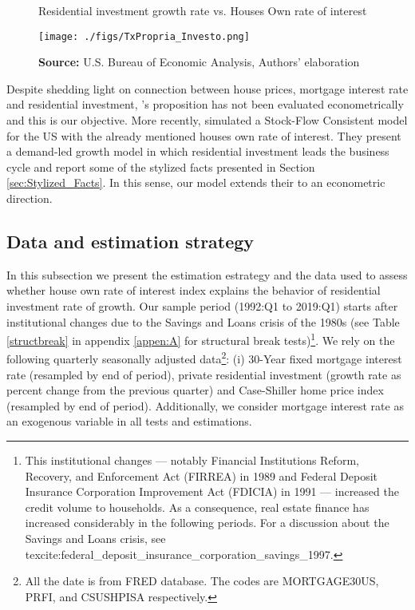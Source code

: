 \documentclass[12pt, a4paper]{article}
\begin{document}
\begin{figure}[htb]
	\centering
	\caption{Residential investment growth rate vs. Houses Own rate of interest}
	\label{propria_investo}
	\texttt{[image: ./figs/TxPropria\_Investo.png]}
	\caption*{\textbf{Source:} U.S. Bureau of Economic Analysis, Authors' elaboration}
\end{figure}

Despite shedding light on connection between house prices, mortgage interest rate and residential investment, \citeauthor*{teixeira_crescimento_2015}'s \citeyear{teixeira_crescimento_2015} proposition has not been evaluated econometrically and this is our objective.
More recently, \textcite{petrini_2021_TD} simulated a Stock-Flow Consistent model for the US with the already mentioned houses own rate of interest.
They present a demand-led growth model in which residential investment leads the business cycle and report some of the stylized facts presented in Section \ref{sec:Stylized_Facts}.
In this sense, our model extends their to an econometric direction.

\subsection{Data and estimation strategy}
\label{sec:org6a9cf5e}
\label{sec:estimation}

In this subsection we present the estimation estrategy and the data used to assess whether house own rate of interest index explains the behavior of residential investment rate of growth.
Our sample period (1992:Q1 to 2019:Q1) starts after institutional changes due to the Savings and Loans crisis of the 1980s (see Table \ref{structbreak} in appendix \ref{appen:A} for structural break tests)\footnote{This institutional changes --- notably Financial Institutions Reform, Recovery, and Enforcement Act (FIRREA) in 1989 and Federal Deposit Insurance Corporation Improvement Act  (FDICIA) in 1991 --- increased the credit volume to households. As a consequence, real estate finance has increased considerably in the following periods. For a discussion about the Savings and Loans crisis, see texcite:federal\_deposit\_insurance\_corporation\_savings\_1997.}.
We rely on the following  quarterly seasonally adjusted data\footnote{All the date is from FRED database. The codes are MORTGAGE30US, PRFI, and CSUSHPISA respectively.}: (i) 30-Year fixed mortgage interest rate (resampled by end of period), private residential investment (growth rate as percent change from the previous quarter) and Case-Shiller home price index
(resampled by end of period).
Additionally, we consider mortgage interest rate as an exogenous variable in all tests and estimations.
\end{document}
